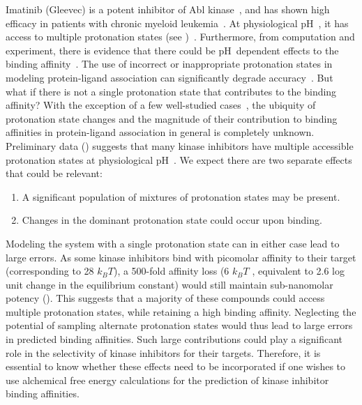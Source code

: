 \documentclass[10pt,final]{article}
\newcommand{\pH}{p$\mathrm{H}$\ }
\begin{document}
Imatinib (Gleevec) is a potent inhibitor of Abl kinase~\autocite{Druker2001a}, and has shown high efficacy in patients with chronic myeloid leukemia~\autocite{OBrien2003a}.
%
At physiological \pH, it has access to multiple protonation states (see )~\autocite{Szakacs2005a}.
%
Furthermore, from computation and experiment, there is evidence that there could be \pH dependent effects to the binding affinity~\autocite{Seeliger2007a,Lin2013a}.
%
The use of incorrect or inappropriate protonation states in modeling protein-ligand association can significantly degrade accuracy~\autocite{Polgar2005a,Wittayanarakul2008a}.
%
But what if there is not a single protonation state that contributes to the binding affinity?
%
With the exception of a few well-studied cases~\autocite{Dullweber2001a,Aleksandrov2007a,Czodrowski2007a,Steuber2007a,Czodrowski2007b}, 
the ubiquity of protonation state changes and the magnitude of their contribution to binding affinities in protein-ligand association in general is completely unknown. 
%
Preliminary data () suggests that many kinase inhibitors have multiple accessible protonation states at physiological \pH.
%
We expect there are two separate effects that could be relevant:
\begin{enumerate}
 \item A significant population of mixtures of protonation states may be present.
 \item Changes in the dominant protonation state could occur upon binding.
\end{enumerate}
%
Modeling the system with a single protonation state can in either case lead to large errors.
%
As some kinase inhibitors bind with picomolar affinity to their target (corresponding to 28 $k_BT$), a 500-fold affinity loss (6 $k_BT$ , equivalent to 2.6 log unit change in the equilibrium constant) would still maintain sub-nanomolar potency ().
%
This suggests that a majority of these compounds could access multiple protonation states, while retaining a high binding affinity.
%
Neglecting the potential of sampling alternate protonation states would thus lead to large errors in predicted binding affinities.
%
Such large contributions could play a significant role in the selectivity of kinase inhibitors for their targets.
%
Therefore, it is essential to know whether these effects need to be incorporated if one wishes to use alchemical free energy calculations for the prediction of kinase inhibitor binding affinities.
\end{document}

